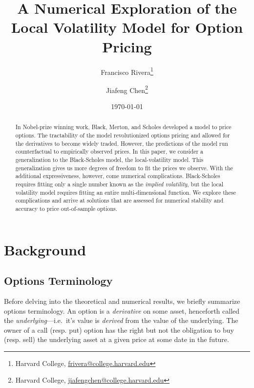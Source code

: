 \documentclass[12pt]{article}
\numberwithin{equation}{section}
\begin{document}
\onecolumn

\title{A Numerical Exploration of the Local Volatility Model for Option Pricing}
\author{Francisco Rivera\thanks{Harvard College, 
\href{mailto:frivera@college.harvard.edu}{frivera@college.harvard.edu} 
} \and Jiafeng Chen\thanks{Harvard College, \href{mailto:jiafengchen@college.harvard.edu}{jiafengchen@college.harvard.edu}}}
\date{\today}

\maketitle

\begin{abstract}
In Nobel-prize winning work, Black, Merton, and Scholes developed a model to
price options. The tractability of the model revolutionized options pricing and
allowed for the derivatives to become widely traded. However, the
predictions of the model run counterfactual to empirically observed prices. In
this paper, we consider a generalization to the Black-Scholes model, the
local-volatility model. This generalization gives us more degrees of freedom to
fit the prices we observe. With the additional expressiveness, however, come
numerical complications. Black-Scholes requires fitting only a single number
known as the \emph{implied volatility}, but the local volatility model requires
fitting an entire multi-dimensional function. We explore these complications and
arrive at solutions that are assessed for numerical stability and accuracy to
price out-of-sample options.
\end{abstract}

\tableofcontents

\newpage

\section{Background}
\label{sec:background}

\subsection{Options Terminology}
\label{subsec:terminology}

Before delving into the theoretical and numerical results, we briefly summarize
options terminology. An option is a \emph{derivative} on some asset, henceforth called
the \emph{underlying}---i.e.\ it's value is \emph{derived} from the value of the
underlying. The owner of a call (resp. put) option has the right but not the obligation
to buy (resp. sell) the underlying asset at a given price at some date in the future.
\end{document}
